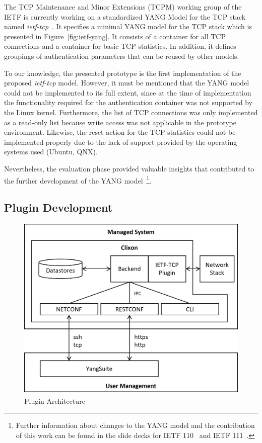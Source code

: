 The TCP Maintenance and Minor Extensions (TCPM) working group of the IETF is currently working on a standardized YANG Model for the TCP stack named \textit{ietf-tcp}~\cite{draft-ietf-tcpm-yang-tcp}. It specifies a minimal YANG model for the TCP stack which is presented in Figure~\ref{fig:ietf-yang}. It consists of a container for all TCP connections and a container for basic TCP statistics. In addition, it defines groupings of authentication parameters that can be reused by other models.

To our knowledge, the presented prototype is the first implementation of the proposed \textit{ietf-tcp} model. However, it must be mentioned that the YANG model could not be implemented to its full extent, since at the time of implementation the functionality required for the authentication container was not supported by the Linux kernel.
Furthermore, the list of TCP connections was only implemented as a read-only list because write access was not applicable in the prototype environment.
Likewise, the reset action for the TCP statistics could not be implemented properly due to the lack of support provided by the operating systems used (Ubuntu, QNX).

Nevertheless, the evaluation phase provided valuable insights that contributed to the further development of the YANG model~\footnote{Further information about changes to the YANG model and the contribution of this work can be found in the slide decks for IETF 110~\cite{ietf-110} and IETF 111~\cite{ietf-111}.}.


\subsection{Plugin Development}
\label{Plugin Development}

\begin{figure}[h!]
    \centering
    \includegraphics[width=\linewidth]{assets/Prototype/Plugin_Architecture_v.png}
    \caption{Plugin Architecture}
    \label{fig:plugin_architecture}
\end{figure}

